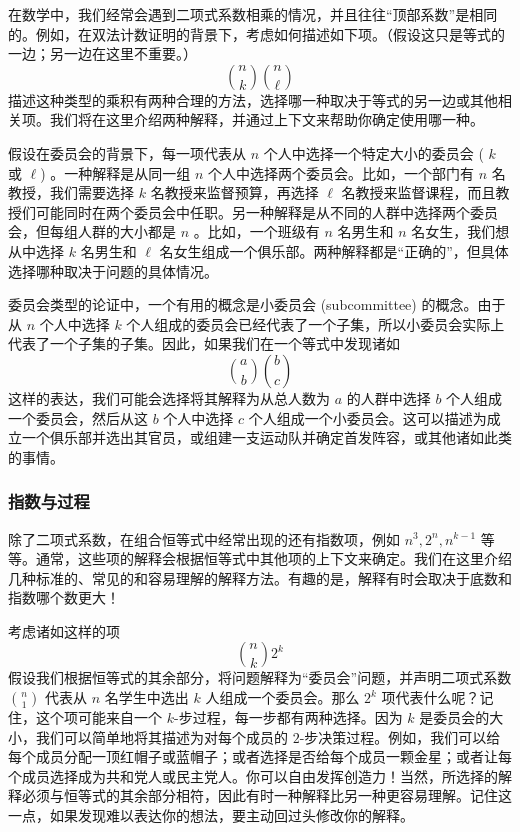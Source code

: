 在数学中，我们经常会遇到二项式系数相乘的情况，并且往往``顶部系数''是相同的。例如，在双法计数证明的背景下，考虑如何描述如下项。（假设这只是等式的一边；另一边在这里不重要。）
\[{n \choose k}{n \choose \ell}\]
描述这种类型的乘积有两种合理的方法，选择哪一种取决于等式的另一边或其他相关项。我们将在这里介绍两种解释，并通过上下文来帮助你确定使用哪一种。

假设在委员会的背景下，每一项代表从 $n$ 个人中选择一个特定大小的委员会 ( $k$ 或 $\ell$) 。一种解释是从同一组 $n$ 个人中选择两个委员会。比如，一个部门有 $n$ 名教授，我们需要选择 $k$ 名教授来监督预算，再选择 $\ell$ 名教授来监督课程，而且教授们可能同时在两个委员会中任职。另一种解释是从不同的人群中选择两个委员会，但每组人群的大小都是 $n$ 。比如，一个班级有 $n$ 名男生和 $n$ 名女生，我们想从中选择 $k$ 名男生和 $\ell$ 名女生组成一个俱乐部。两种解释都是``正确的''，但具体选择哪种取决于问题的具体情况。

委员会类型的论证中，一个有用的概念是小委员会 (subcommittee) 的概念。由于从 $n$ 个人中选择 $k$ 个人组成的委员会已经代表了一个子集，所以小委员会实际上代表了一个子集的子集。因此，如果我们在一个等式中发现诸如
\[{a \choose b}{b \choose c}\]
这样的表达，我们可能会选择将其解释为从总人数为 $a$ 的人群中选择 $b$ 个人组成一个委员会，然后从这 $b$ 个人中选择 $c$ 个人组成一个小委员会。这可以描述为成立一个俱乐部并选出其官员，或组建一支运动队并确定首发阵容，或其他诸如此类的事情。

\subsubsection*{指数与过程}

除了二项式系数，在组合恒等式中经常出现的还有指数项，例如 $n^3, 2^n, n^{k-1}$ 等等。通常，这些项的解释会根据恒等式中其他项的上下文来确定。我们在这里介绍几种标准的、常见的和容易理解的解释方法。有趣的是，解释有时会取决于底数和指数哪个数更大！

考虑诸如这样的项
\[{n \choose k}2^k\]
假设我们根据恒等式的其余部分，将问题解释为``委员会''问题，并声明二项式系数 ${n \choose 1}$ 代表从 $n$ 名学生中选出 $k$ 人组成一个委员会。那么 $2^k$ 项代表什么呢？记住，这个项可能来自一个 $k$-步过程，每一步都有两种选择。因为 $k$ 是委员会的大小，我们可以简单地将其描述为对每个成员的 $2$-步决策过程。例如，我们可以给每个成员分配一顶红帽子或蓝帽子；或者选择是否给每个成员一颗金星；或者让每个成员选择成为共和党人或民主党人。你可以自由发挥创造力！当然，所选择的解释必须与恒等式的其余部分相符，因此有时一种解释比另一种更容易理解。记住这一点，如果发现难以表达你的想法，要主动回过头修改你的解释。

